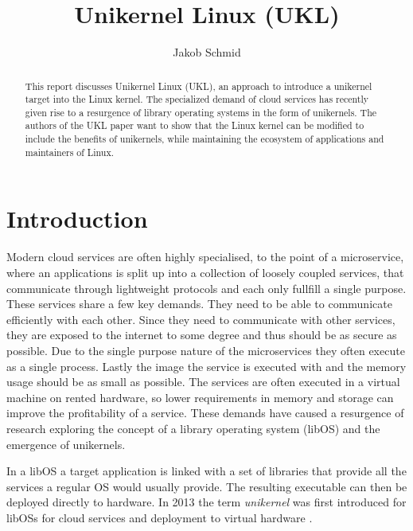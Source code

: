 \documentclass[10pt,twocolumn,a4paper]{article}
\author{Jakob Schmid}
\begin{document}
\title{Unikernel Linux (UKL)}

\newcommand{\todo}[1]{{\texttt{[#1]}}}
\newcommand{\code}[1]{{\tt \small{#1}}}

\maketitle

\begin{abstract}
  This report discusses Unikernel Linux (UKL), an approach to introduce a
  unikernel target into the Linux kernel.
  The specialized demand of cloud services has recently given rise
  to a resurgence of library operating systems in the form of unikernels.
  The authors of the UKL paper want to show that the Linux kernel can be
  modified to include the benefits of unikernels, while maintaining the
  ecosystem of applications and maintainers of Linux.
\end{abstract}

\section{Introduction}\label{sec:introduction}
  Modern cloud services are often highly specialised, to the point of a microservice, 
  where an applications is split up into a collection of loosely coupled services,
  that communicate through lightweight protocols and each only fullfill a single purpose.
  These services share a few key demands. They need to be able to communicate 
  efficiently with each other. Since they need to communicate with other services,
  they are exposed to the internet to some degree and thus should be as secure as possible.
  Due to the single purpose nature of the microservices they often execute as a single process.
  Lastly the image the service is executed with and the memory usage should be as small as possible.
  The services are often executed in a virtual machine on rented hardware, so lower requirements
  in memory and storage can improve the profitability of a service.
  These demands have caused a resurgence of research exploring the concept of 
  a library operating system (libOS) and the emergence of unikernels. 

  In a libOS a target application is linked with a set of
  libraries that provide all the services a regular OS would usually provide.
  The resulting executable can then be deployed directly to hardware.
  In 2013 the term \textit{unikernel} was first introduced for libOSs
  for cloud services and deployment to virtual hardware \cite{madhavapeddy13}.
\end{document}
